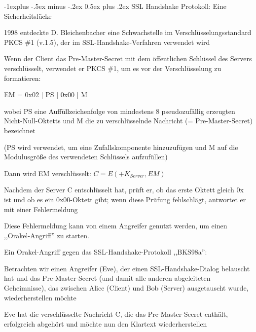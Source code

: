 \documentclass[a4paper]{article}
\makeatletter
\renewcommand{\subsection}{\@startsection{subsection}{2}{0mm}%
 {-1explus -.5ex minus -.2ex}%
 {0.5ex plus .2ex}%
 {\normalfont\normalsize\bfseries}}
\makeatother
\begin{document}
\begin{multicols}{3}
      \subsection{SSL Handshake Protokoll: Eine Sicherheitslücke}
      \begin{itemize*}
            \item 1998 entdeckte D. Bleichenbacher eine Schwachstelle im Verschlüsselungsstandard PKCS \#1 (v.1.5), der im SSL-Handshake-Verfahren verwendet wird
            \item Wenn der Client das Pre-Master-Secret mit dem öffentlichen Schlüssel des Servers verschlüsselt, verwendet er PKCS \#1, um es vor der Verschlüsselung zu formatieren:
            \begin{itemize*}
                  \item EM = 0x02 | PS | 0x00 | M
                  \begin{itemize*}
                        \item wobei PS eine Auffüllzeichenfolge von mindestens 8 pseudozufällig erzeugten Nicht-Null-Oktetts und M die zu verschlüsselnde Nachricht (= Pre-Master-Secret) bezeichnet
                        \item (PS wird verwendet, um eine Zufallskomponente hinzuzufügen und M auf die Modulusgröße des verwendeten Schlüssels aufzufüllen)
                  \end{itemize*}
                  \item Dann wird EM verschlüsselt: $C = E(+K_{Server}, EM)$
                  \item Nachdem der Server C entschlüsselt hat, prüft er, ob das erste Oktett gleich 0x ist und ob es ein 0x00-Oktett gibt; wenn diese Prüfung fehlschlägt, antwortet er mit einer Fehlermeldung
                  \item Diese Fehlermeldung kann von einem Angreifer genutzt werden, um einen ,,Orakel-Angriff'' zu starten.
            \end{itemize*}
            \item Ein Orakel-Angriff gegen das SSL-Handshake-Protokoll ,,BKS98a'':
            \begin{itemize*}
                  \item Betrachten wir einen Angreifer (Eve), der einen SSL-Handshake-Dialog belauscht hat und das Pre-Master-Secret (und damit alle anderen abgeleiteten Geheimnisse), das zwischen Alice (Client) und Bob (Server) ausgetauscht wurde, wiederherstellen möchte
                  \item Eve hat die verschlüsselte Nachricht C, die das Pre-Master-Secret enthält, erfolgreich abgehört und möchte nun den Klartext wiederherstellen

\end{itemize*}
\end{itemize*}
\end{multicols}
\end{document}
